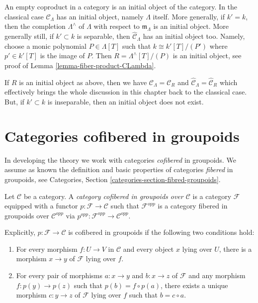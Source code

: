 \noindent
An empty coproduct in a category is an initial object of the category.
In the classical case $\widehat{\mathcal{C}}_\Lambda$ has an initial
object, namely $\Lambda$ itself. More generally, if $k' = k$, then
the completion $\Lambda^\wedge$ of $\Lambda$ with respect to
$\mathfrak m_\Lambda$ is an initial object. More generally still, if
$k' \subset k$ is separable, then $\widehat{\mathcal{C}}_\Lambda$ has an
initial object too. Namely, choose a monic polynomial $P \in \Lambda[T]$
such that $k \cong k'[T]/(P')$ where $p' \in k'[T]$ is the image
of $P$. Then $R = \Lambda^\wedge[T]/(P)$ is an initial object, see proof of
Lemma \ref{lemma-fiber-product-CLambda}.

\medskip\noindent
If $R$ is an initial object as above, then we have
$\mathcal{C}_\Lambda = \mathcal{C}_R$ and
$\widehat{\mathcal{C}}_\Lambda = \widehat{\mathcal{C}}_R$ which effectively
brings the whole discussion in this chapter back to the classical case.
But, if $k' \subset k$ is inseparable, then an initial object does not
exist.



\section{Categories cofibered in groupoids}
\label{section-preliminary}

\noindent
In developing the theory we work with categories {\it cofibered} in groupoids. 
 We assume as known the definition and basic properties of categories 
{\it fibered} in groupoids, see
Categories, Section \ref{categories-section-fibred-groupoids}.

\begin{definition}
\label{definition-category-cofibred-groupoids}
Let $\mathcal{C}$ be a category.  A {\it category cofibered in groupoids over 
$\mathcal{C}$} is a category $\mathcal{F}$ equipped with a functor
$p: \mathcal{F} \to \mathcal{C}$ such that $\mathcal{F}^{opp}$ is a category 
fibered in groupoids over $\mathcal{C}^{opp}$ via
$p^{opp}: \mathcal{F}^{opp} \to \mathcal{C}^{opp}$.
\end{definition}

\noindent
Explicitly, $p: \mathcal{F} \to \mathcal{C}$ is cofibered in groupoids if 
the following two conditions hold:
\begin{enumerate}
\item For every morphism $f: U \to V$ in $\mathcal{C}$ and every object 
$x$ lying over $U$, there is a morphism $x \to y$ of $\mathcal{F}$ lying 
over $f$.
\item For every pair of morphisms $a: x \to y$ and $b: x \to z$ 
of $\mathcal{F}$ and any morphism $f: p(y) \to p(z)$ such that $p(b) = f 
\circ p(a)$, there exists a unique morphism $c: y \to z$ of $\mathcal 
F$ lying over $f$ such that $b = c \circ a$.
\end{enumerate}

